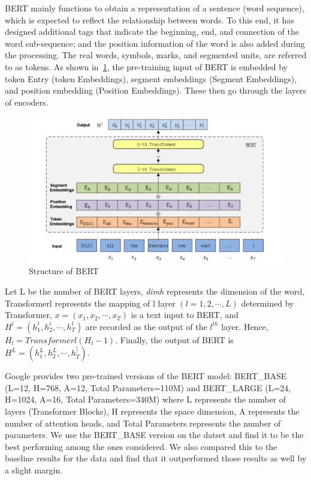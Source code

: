 \documentclass[11pt]{article}
\begin{document}
BERT mainly functions to obtain a representation of a sentence (word sequence), which is expected to reflect the relationship between words. To this end, it has designed additional tags that indicate the beginning, end, and connection of the word sub-sequence; and the position information of the word is also added during the processing. The real words, symbols, marks, and segmented units, are referred to as tokens. As shown in~\ref{fig:bert}, the pre-training input of BERT is embedded by token Entry (token Embeddings), segment embeddings (Segment Embeddings), and position embedding (Position Embeddings). These then go through the layers of encoders.

\begin{figure}
\label{fig:bert}
\caption{Structure of BERT}
\centering
\includegraphics[scale=0.5]{images/BERT.png}
\end{figure}

Let L be the number of BERT layers, \textit{dimh} represents the dimension of the word, Transformerl represents the mapping of l layer \(\left ( l = 1, 2, \cdots , L \right )\) determined by Transformer, \(x = \left ( x_{1}, x_{2}, \cdots , x_{T}  \right )\) is a text input to BERT, and \(H^{l} = \left ( h_{1}^{l}, h_{2}^{l}, \cdots, h_{T}^{l} \right )\) are recorded as the output of the $l^{th}$ layer. Hence, $H_{l} = Transformerl\left ( H_{l}-1\right )$. Finally, the output of BERT is $H^{L} = \left ( h_{1}^{L}, h_{2}^{L}, \cdots, h_{T}^{]} \right )$. 

Google provides two pre-trained versions of the BERT model: BERT\_BASE (L=12, H=768, A=12, Total Parameters=110M) and BERT\_LARGE (L=24, H=1024, A=16, Total Parameters=340M) where L represents the number of layers (Transformer Blocks), H represents the space dimension, A represents the number of attention heads, and Total Parameters represents the number of parameters. We use the BERT\_BASE version on the datset and find it to be the best performing among the ones considered. We also compared this to the baseline results for the data and find that it outperformed those results as well by a slight margin.
\end{document}
